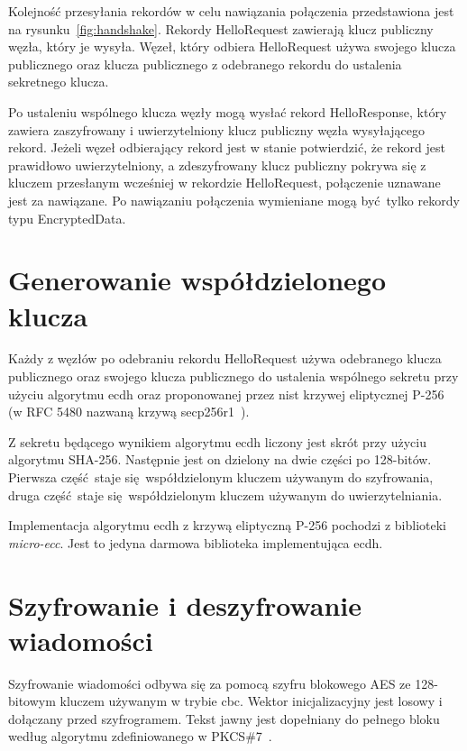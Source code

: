 Kolejność przesyłania rekordów w celu nawiązania połączenia przedstawiona jest na rysunku~\ref{fig:handshake}. Rekordy HelloRequest zawierają klucz publiczny węzła, który je wysyła. Węzeł, który odbiera HelloRequest używa swojego klucza publicznego oraz klucza publicznego z odebranego rekordu do ustalenia sekretnego klucza.

Po ustaleniu wspólnego klucza węzły mogą wysłać rekord HelloResponse, który zawiera zaszyfrowany i uwierzytelniony klucz publiczny węzła wysyłającego rekord. Jeżeli węzeł odbierający rekord jest w stanie potwierdzić, że rekord jest prawidłowo uwierzytelniony, a zdeszyfrowany klucz publiczny pokrywa się z kluczem przesłanym wcześniej w rekordzie HelloRequest, połączenie uznawane jest za nawiązane. Po nawiązaniu połączenia wymieniane mogą być tylko rekordy typu EncryptedData.

\section{Generowanie współdzielonego klucza}
\label{sec:sharedkey}

Każdy z węzłów po odebraniu rekordu HelloRequest używa odebranego klucza publicznego oraz swojego klucza publicznego do ustalenia wspólnego sekretu przy użyciu algorytmu \gls{ecdh} oraz proponowanej przez \gls{nist} krzywej eliptycznej P-256~\cite{kerry2013digital} (w RFC 5480 nazwaną krzywą secp256r1~\cite{turner2009elliptic}).

Z sekretu będącego wynikiem algorytmu \gls{ecdh} liczony jest skrót przy użyciu algorytmu SHA-256. Następnie jest on dzielony na dwie części po 128-bitów. Pierwsza część staje się współdzielonym kluczem używanym do szyfrowania, druga część staje się współdzielonym kluczem używanym do uwierzytelniania.

Implementacja algorytmu \gls{ecdh} z krzywą eliptyczną P-256 pochodzi z biblioteki \emph{micro-ecc}. Jest to jedyna darmowa biblioteka implementująca \gls{ecdh}.

\section{Szyfrowanie i deszyfrowanie wiadomości}
\label{sec:encrypt}

Szyfrowanie wiadomości odbywa się za pomocą szyfru blokowego AES ze 128-bitowym kluczem używanym w trybie \gls{cbc}. Wektor inicjalizacyjny jest losowy i dołączany przed szyfrogramem. Tekst jawny jest dopełniany do pełnego bloku według algorytmu zdefiniowanego w PKCS\#7~\cite{kaliski1998pkcs}.

